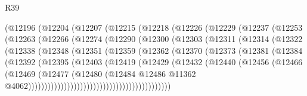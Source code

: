 \begin{lexlean}{R39}
\begin{coremodule}
            (@12196
              (@12204
                (@12207
                  (@12215
                    (@12218
                      (@12226
                        (@12229
                          (@12237
                            (@12253
                              (@12263
                                (@12266
                                  (@12274
                                    (@12290
                                      (@12300
                                        (@12303
                                          (@12311
                                            (@12314
                                              (@12322
                                                (@12338
                                                  (@12348
                                                    (@12351
                                                      (@12359
                                                        (@12362
                                                          (@12370
                                                            (@12373
                                                              (@12381
                                                                (@12384
                                                                  (@12392
                                                                    (@12395
                                                                      (@12403
                                                                        (@12419
                                                                          (@12429
                                                                            (@12432
                                                                              (@12440
                                                                                (@12456
                                                                                  (@12466
                                                                                    (@12469
                                                                                      (@12477
                                                                                        (@12480
                                                                                          (@12484
                                                                                            @12486
                                                                                            @11362
                                                                                            @4062))))))))))))))))))))))))))))))))))))))))))))

\end{coremodule}
\end{lexlean}
